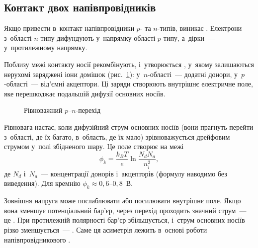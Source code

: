 \subsection*{Контакт двох напівпровідників}


Якщо привести в~контакт напівпровідники $p$- та $n$-типів, виникає
. Електрони з~області $n$-типу дифундують у~напрямку області
$p$-типу, а~дірки~--- у~протилежному напрямку.

Поблизу межі контакту носії рекомбінують, і~утворюється , у~якому
залишаються нерухомі заряджені іони домішок (рис.~\ref{pic:PNJunction}): у~$n$-області~---
додатні донори, у~$p$-області~--- від'ємні акцептори. Ці заряди створюють внутрішнє
електричне поле, яке перешкоджає подальшій дифузії основних носіїв.

\begin{figure}[h!]\centering
	\caption{Рівноважний $p$--$n$-перехід\label{pic:PNJunction}}
\end{figure}

Рівновага настає, коли дифузійний струм основних носіїв (вони прагнуть перейти з~області,
де їх багато, в~область, де їх мало) зрівноважується дрейфовим струмом у~полі збідненого
шару. Це поле створює на межі 
\begin{equation}\label{eq:ContactPotential}
	\phi_k=\frac{k_BT}{e}\ln\frac{N_dN_a}{n_i^2},
\end{equation}
де $N_d$ і~$N_a$~--- концентрації донорів і~акцепторів (формулу наводимо без виведення).
Для кремнію $\phi_k\approx0{,}6$--$0{,}8$~В.

Зовнішня напруга може послаблювати або посилювати внутрішнє поле. Якщо вона зменшує
потенціальний бар'єр, через перехід проходить значний струм~--- це .
При протилежній полярності бар'єр збільшується, і~струм основних носіїв різко
зменшується~--- . Саме ця асиметрія лежить в~основі роботи
напівпровідникового .

